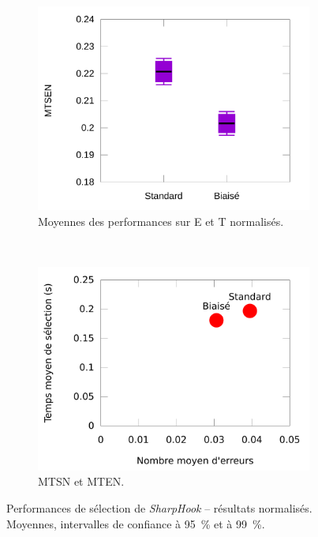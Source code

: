 \begin{figure}[htbp]
\begin{subfigure}[t]{0.49\textwidth}
			\includegraphics[width=\textwidth]{figures/ch5/hookNormProducts}
			\caption{Moyennes des performances sur E et T normalisés.}
			\label{fig:hookNormProducts}
		\end{subfigure}
		~
		\begin{subfigure}[t]{0.49\textwidth}
			\centering
			\includegraphics[width=\textwidth]{figures/ch5/normHookErrorsTimesScatter}
			\caption{MTSN et MTEN.}
			\label{fig:normHookErrorsTimesScatter}
		\end{subfigure}
		\caption[\emph{SharpHook} -- résultats normalisés]{Performances de sélection de \emph{SharpHook} -- résultats normalisés. Moyennes, intervalles de confiance à 95~\%{} et à 99~\%{}.}
		\label{fig:normHookPerfs}
	\end{figure}
	
